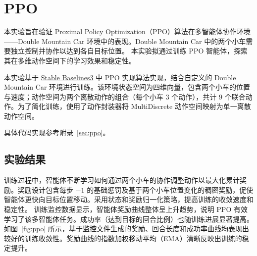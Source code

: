 \documentclass[citestyle=gb7714-2015, bibstyle=gb7714-2015,lang=cn,14pt,scheme=chinese]{elegantbook}
\begin{document}


\section{PPO}

本实验旨在验证 Proximal Policy Optimization（PPO）算法在多智能体协作环境——Double Mountain Car 环境中的表现。Double Mountain Car 中的两个小车需要独立控制并协作以达到各自目标位置。
本实验拟通过训练 PPO 智能体，探索其在多维动作空间下的学习效果和稳定性。

本实验基于 \href{https://github.com/DLR-RM/stable-baselines3}{Stable Baselines3} 中 PPO 实现算法实现，结合自定义的 Double Mountain Car 环境进行训练。该环境状态空间为四维向量，包含两个小车的位置与速度；动作空间为两个离散动作的组合（每个小车 \(3\) 个动作），共计 \(9\) 个联合动作。为了简化训练，使用了动作封装器将 MultiDiscrete 动作空间映射为单一离散动作空间。

具体代码实现参考附录~\ref{sec:ppo}。

\subsection{实验结果}

训练过程中，智能体不断学习如何通过两个小车的协作调整动作以最大化累计奖励。奖励设计包含每步 \(-1\) 的基础惩罚及基于两个小车位置变化的稠密奖励，促使智能体更快向目标位置移动。采用状态和奖励归一化策略，提高训练的收敛速度和稳定性。
训练监控数据显示，智能体奖励曲线整体呈上升趋势，说明 PPO 有效学习了该多智能体任务。成功率（达到目标的回合比例）也随训练进展显著提高。
如图~\ref{fig:ppo} 所示，基于监控文件生成的奖励、回合长度和成功率曲线均表现出较好的训练收敛性。奖励曲线的指数加权移动平均（EMA）清晰反映出训练的稳定提升。
\end{document}

